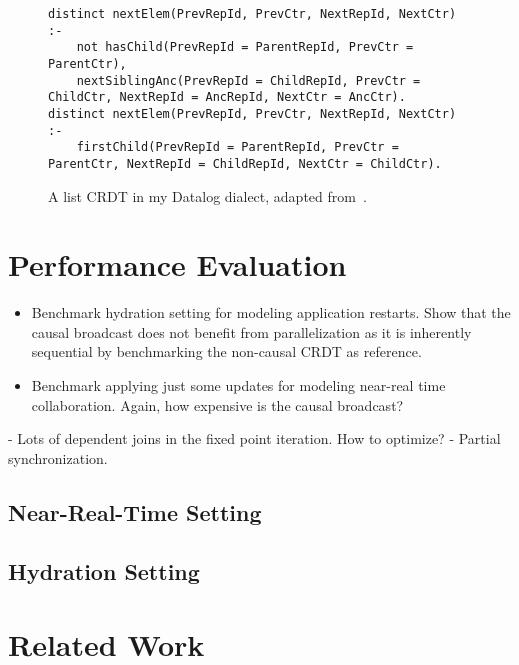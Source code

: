 \begin{figure}[htpb]
\begin{lstlisting}[keepspaces]
distinct nextElem(PrevRepId, PrevCtr, NextRepId, NextCtr) :-
    not hasChild(PrevRepId = ParentRepId, PrevCtr = ParentCtr),
    nextSiblingAnc(PrevRepId = ChildRepId, PrevCtr = ChildCtr, NextRepId = AncRepId, NextCtr = AncCtr).
distinct nextElem(PrevRepId, PrevCtr, NextRepId, NextCtr) :-
    firstChild(PrevRepId = ParentRepId, PrevCtr = ParentCtr, NextRepId = ChildRepId, NextCtr = ChildCtr).\end{lstlisting}
	\caption{A list \ac{CRDT} in my Datalog dialect, adapted from~\cite{kleppmann2018data}.}\label{code:list-crdt-datalog-dialect}
\end{figure}

\section{Performance Evaluation}\label{sec:benchmarks}

\begin{itemize}
	\item Benchmark hydration setting for modeling application restarts.
	      Show that the causal broadcast does not benefit from parallelization
	      as it is inherently sequential by benchmarking the non-causal CRDT
	      as reference.
	\item Benchmark applying just some updates for modeling near-real time collaboration.
	      Again, how expensive is the causal broadcast?
\end{itemize}

- Lots of dependent joins in the fixed point iteration. How to optimize?
- Partial synchronization.

\subsection{Near-Real-Time Setting}\label{sec:near-real-time-benchmark}

\subsection{Hydration Setting}\label{sec:hydration-benchmark}

\section{Related Work}\label{sec:related-work}

